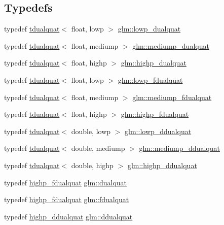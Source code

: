 \subsection*{Typedefs}
\begin{DoxyCompactItemize}
\item 
typedef \hyperlink{structglm_1_1tdualquat}{tdualquat}$<$ float, lowp $>$ \hyperlink{group__gtx__dual__quaternion_ga4888200ed911e4887c2423fed74ad362}{glm\+::lowp\+\_\+dualquat}
\item 
typedef \hyperlink{structglm_1_1tdualquat}{tdualquat}$<$ float, mediump $>$ \hyperlink{group__gtx__dual__quaternion_gaa88fe93eb823d1aba8d6df8028572cb5}{glm\+::mediump\+\_\+dualquat}
\item 
typedef \hyperlink{structglm_1_1tdualquat}{tdualquat}$<$ float, highp $>$ \hyperlink{group__gtx__dual__quaternion_ga98557c3577757f2ced8f35b1de7fa234}{glm\+::highp\+\_\+dualquat}
\item 
typedef \hyperlink{structglm_1_1tdualquat}{tdualquat}$<$ float, lowp $>$ \hyperlink{group__gtx__dual__quaternion_ga797f6d2679ab6773c1f057b97bf95111}{glm\+::lowp\+\_\+fdualquat}
\item 
typedef \hyperlink{structglm_1_1tdualquat}{tdualquat}$<$ float, mediump $>$ \hyperlink{group__gtx__dual__quaternion_ga93e9def86ffeedd48d9c79a6afacfa6c}{glm\+::mediump\+\_\+fdualquat}
\item 
typedef \hyperlink{structglm_1_1tdualquat}{tdualquat}$<$ float, highp $>$ \hyperlink{group__gtx__dual__quaternion_ga8c46d61c38b2b6d9c5091c667dd20fe8}{glm\+::highp\+\_\+fdualquat}
\item 
typedef \hyperlink{structglm_1_1tdualquat}{tdualquat}$<$ double, lowp $>$ \hyperlink{group__gtx__dual__quaternion_ga361a2ea6cce1446a8ab7e7803156c16c}{glm\+::lowp\+\_\+ddualquat}
\item 
typedef \hyperlink{structglm_1_1tdualquat}{tdualquat}$<$ double, mediump $>$ \hyperlink{group__gtx__dual__quaternion_ga5727116ab20b2a1d40387766d723dd6c}{glm\+::mediump\+\_\+ddualquat}
\item 
typedef \hyperlink{structglm_1_1tdualquat}{tdualquat}$<$ double, highp $>$ \hyperlink{group__gtx__dual__quaternion_ga83e4c5d27c8b0a264a3f3aed24f3f84e}{glm\+::highp\+\_\+ddualquat}
\item 
typedef \hyperlink{group__gtx__dual__quaternion_ga8c46d61c38b2b6d9c5091c667dd20fe8}{highp\+\_\+fdualquat} \hyperlink{group__gtx__dual__quaternion_ga2f6227b5f9dc08a2e7682065a84b3aa9}{glm\+::dualquat}
\item 
typedef \hyperlink{group__gtx__dual__quaternion_ga8c46d61c38b2b6d9c5091c667dd20fe8}{highp\+\_\+fdualquat} \hyperlink{group__gtx__dual__quaternion_ga436906129bc69ca5059555cafcbac9fd}{glm\+::fdualquat}
\item 
typedef \hyperlink{group__gtx__dual__quaternion_ga83e4c5d27c8b0a264a3f3aed24f3f84e}{highp\+\_\+ddualquat} \hyperlink{group__gtx__dual__quaternion_ga373431ffdd82d5c03c258217a9e1f1a6}{glm\+::ddualquat}
\end{DoxyCompactItemize}
